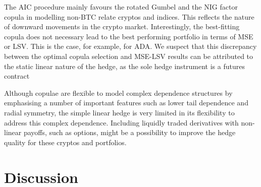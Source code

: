 The AIC procedure mainly favours the rotated Gumbel and the NIG
factor copula in modelling non-BTC relate cryptos and indices. This
reflects the  nature of 
downward movements in the crypto market. Interestingly, the best-fitting
copula does not necessary lead to the best performing portfolio in
terms of MSE or LSV. This is the case, for example, for ADA. 
We suspect that this discrepancy between the optimal copula selection and
MSE-LSV results can be attributed to the static linear nature of the
hedge, as the sole hedge instrument is a futures contract

 Although copulae are
flexible to model complex dependence structures 
by emphasising a number of important features such as lower tail
dependence and radial symmetry, the simple linear hedge is very
limited in its flexibility to address this complex dependence.
Including liquidly traded derivatives with non-linear payoffs, such as
options, might be a possibility to improve the hedge quality for these
cryptos and portfolios.


\section{Discussion}\label{sec:discussion}


